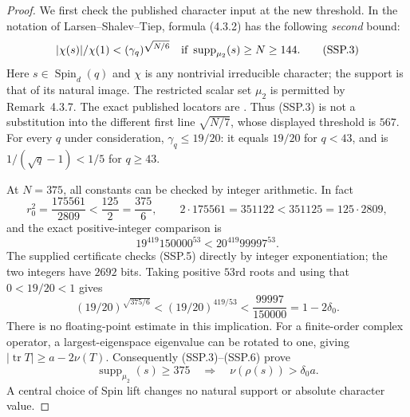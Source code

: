 \begin{proof}
We first check the published character input at the new threshold.
In the notation of Larsen--Shalev--Tiep, formula (4.3.2) has
the following \emph{second} bound:
\[
 |\chi(s)|/\chi(1)<(\gamma_q)^{\sqrt{N/6}}
        \quad\hbox{if }\operatorname{supp}_{\mu_2}(s)\ge N\ge144.
 \tag{SSP.3}
\]
Here $s\in\operatorname{Spin}_d(q)$ and $\chi$ is any nontrivial
irreducible character; the support is that of its natural image.
The restricted scalar set $\mu_2$ is permitted by Remark~4.3.7.
The exact published locators are
\cite[(4.1.1), p.~1907; Theorem~4.3.6, (4.3.2), p.~1918;
complete proof pp.~1918--1923; Remark~4.3.7, p.~1923]{HOS:LST2011}.
Thus (SSP.3) is not a substitution into the different first
line $\sqrt{N/7}$, whose displayed threshold is $567$.
For every $q$ under consideration, $\gamma_q\le19/20$:
it equals $19/20$ for $q<43$, and is
$1/(\sqrt q-1)<1/5$ for $q\ge43$.

At $N=375$, all constants can be checked by integer arithmetic.
In fact
\[
 r_0^2=\frac{175561}{2809}<\frac{125}{2}=\frac{375}{6},
 \qquad 2\cdot175561=351122<351125=125\cdot2809,
 \tag{SSP.4}
\]
and the exact positive-integer comparison is
\[
                  19^{419}150000^{53}
                    <20^{419}99997^{53}.                    \tag{SSP.5}
\]
The supplied certificate checks (SSP.5) directly by integer
exponentiation; the two integers have $2692$ bits.
Taking positive $53$rd roots and using that $0<19/20<1$ gives
\[
 (19/20)^{\sqrt{375/6}}
       <(19/20)^{419/53}
       <\frac{99997}{150000}=1-2\delta_0.
 \tag{SSP.6}
\]
There is no floating-point estimate in this implication.
For a finite-order complex operator, a largest-eigenspace
eigenvalue can be rotated to one, giving
$|\operatorname{tr}T|\ge a-2\nu(T)$.
Consequently (SSP.3)--(SSP.6) prove
\[
 \operatorname{supp}_{\mu_2}(s)\ge375
            \quad\Longrightarrow\quad\nu(\rho(s))>\delta_0a.
 \tag{SSP.7}
\]
A central choice of Spin lift changes no natural support
or absolute character value.


\end{proof}
